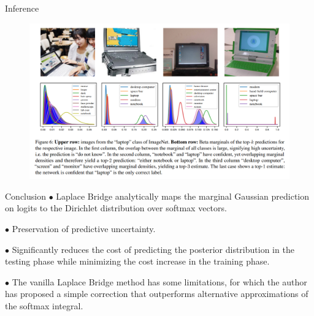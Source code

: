 \documentclass{beamer}
\begin{document}
\begin{frame}{Inference}
 \begin{figure}
        \centering
        \includegraphics[width=1.0\textwidth]{figs/laptop.png} %
    \end{figure}

\end{frame}
\begin{frame}{Conclusion}
    $\bullet$  Laplace Bridge analytically maps the marginal Gaussian prediction on logits to the Dirichlet distribution over softmax vectors.

    $\bullet$ Preservation of predictive uncertainty.

    $\bullet$ Significantly reduces the cost of predicting the posterior distribution in the testing phase while minimizing the cost increase in the training phase.

    $\bullet$ The vanilla Laplace Bridge method has some limitations, for which the author has proposed a simple correction that outperforms alternative approximations of the softmax integral.

\end{frame}

%     
%     
\end{document}
